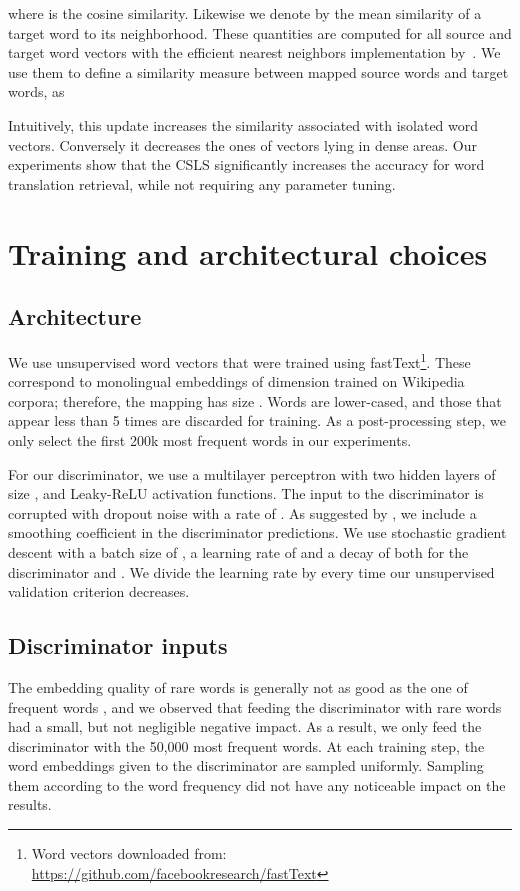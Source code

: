 \documentclass{article} \usepackage{iclr2018_conference,times}
\newcommand{\hub}{CSLS\xspace}
\begin{document}
where  is the cosine similarity. Likewise we denote by  the mean similarity of a target word  to its neighborhood. 
These quantities are computed for all source and target word vectors with the efficient nearest neighbors implementation by~\cite{johnson2017billion}. We use them to define a similarity measure  between mapped source words and target words, as


Intuitively, this update increases the similarity associated with isolated word vectors. Conversely it decreases the ones of vectors lying in dense areas. Our experiments show that the \hub significantly increases the accuracy for word translation retrieval, while not requiring any parameter tuning.
 \section{Training and architectural choices}
\label{sec_training}

\subsection{Architecture}
We use unsupervised word vectors that were trained using fastText\footnote{Word vectors downloaded from:
\url{https://github.com/facebookresearch/fastText}}. 
These correspond to monolingual embeddings of dimension  trained on Wikipedia corpora; therefore, the mapping  has size . Words are lower-cased, and those that appear less than 5 times are discarded for training. As a post-processing step, we only select the first 200k most frequent words in our experiments.

For our discriminator, we use a multilayer perceptron with two hidden layers of size , and Leaky-ReLU activation functions. The input
to the discriminator is corrupted with dropout noise with a rate of . As suggested by \cite{goodfellow2016nips}, we include a smoothing coefficient  in the discriminator predictions. We use stochastic gradient descent with a batch size of , a learning rate of  and a decay of  both for the discriminator and . We divide the learning rate by  every time our unsupervised validation criterion decreases.

\subsection{Discriminator inputs}
The embedding quality of rare words is generally not as good as the one of frequent words \citep{luong2013better}, and we observed that feeding the discriminator with rare words had a small, but not negligible negative impact. As a result, we only feed the discriminator with the 50,000 most frequent words. At each training step, the word embeddings given to the discriminator are sampled uniformly. Sampling them according to the word frequency did not have any noticeable impact on the results.
\end{document}
